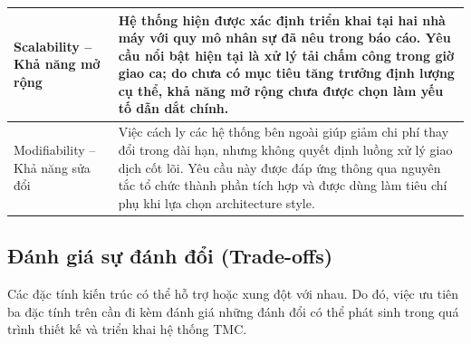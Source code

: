 \begin{longtable}{|>{\raggedright\arraybackslash}p{4.2cm}|>{\raggedright\arraybackslash}p{10.7cm}|}
\hline
Scalability -- Khả năng mở rộng & Hệ thống hiện được xác định triển khai tại hai nhà máy với quy mô nhân sự đã nêu trong báo cáo. Yêu cầu nổi bật hiện tại là xử lý tải chấm công trong giờ giao ca; do chưa có mục tiêu tăng trưởng định lượng cụ thể, khả năng mở rộng chưa được chọn làm yếu tố dẫn dắt chính. \\
\hline
Modifiability -- Khả năng sửa đổi & Việc cách ly các hệ thống bên ngoài giúp giảm chi phí thay đổi trong dài hạn, nhưng không quyết định luồng xử lý giao dịch cốt lõi. Yêu cầu này được đáp ứng thông qua nguyên tắc tổ chức thành phần tích hợp và được dùng làm tiêu chí phụ khi lựa chọn architecture style. \\
\end{longtable}
\normalsize

\subsection{Đánh giá sự đánh đổi (Trade-offs)}

Các đặc tính kiến trúc có thể hỗ trợ hoặc xung đột với nhau. Do đó, việc ưu tiên ba đặc tính trên cần đi kèm đánh giá những đánh đổi có thể phát sinh trong quá trình thiết kế và triển khai hệ thống TMC.

